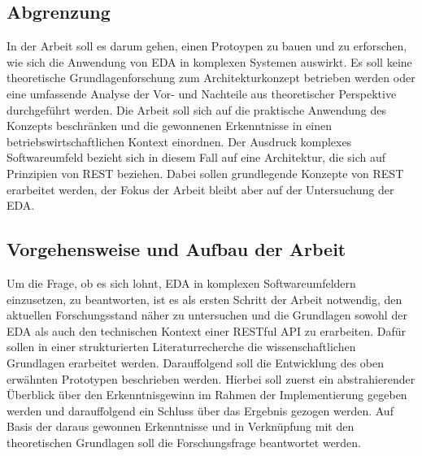 \subsection{Abgrenzung}
In der Arbeit soll es darum gehen, einen Protoypen zu bauen und zu erforschen, wie sich die Anwendung von \ac{EDA} in komplexen Systemen auswirkt. Es soll keine theoretische Grundlagenforschung zum Architekturkonzept betrieben werden oder eine umfassende Analyse der Vor- und Nachteile aus theoretischer Perspektive durchgeführt werden. Die Arbeit soll sich auf die praktische Anwendung des Konzepts beschränken und die gewonnenen Erkenntnisse in einen betriebswirtschaftlichen Kontext einordnen. Der Ausdruck komplexes Softwareumfeld bezieht sich in diesem Fall auf eine Architektur, die sich auf Prinzipien von \ac{REST} beziehen. Dabei sollen grundlegende Konzepte von \ac{REST} erarbeitet werden, der Fokus der Arbeit bleibt aber auf der Untersuchung der \ac{EDA}.

\subsection{Vorgehensweise und Aufbau der Arbeit}
Um die Frage, ob es sich lohnt, \ac{EDA} in komplexen Softwareumfeldern einzusetzen, zu beantworten, ist es als ersten Schritt der Arbeit notwendig, den aktuellen Forschungsstand näher zu untersuchen und die Grundlagen sowohl der \ac{EDA} als auch den technischen Kontext einer RESTful API zu erarbeiten. Dafür sollen in einer strukturierten Literaturrecherche die wissenschaftlichen Grundlagen erarbeitet werden. Darauffolgend soll die Entwicklung des oben erwähnten Prototypen beschrieben werden. Hierbei soll zuerst ein abstrahierender Überblick über den Erkenntnisgewinn im Rahmen der Implementierung gegeben werden und darauffolgend ein Schluss über das Ergebnis gezogen werden. Auf Basis der daraus gewonnen Erkenntnisse und in Verknüpfung mit den theoretischen Grundlagen soll die Forschungsfrage beantwortet werden. 